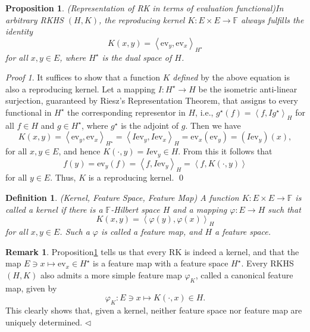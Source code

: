 \documentclass[a4paper,12pt]{article}
\newtheorem{prp}[thm]{Proposition}
\newtheorem{dfn}[thm]{Definition}
\theoremstyle{remark}
\newtheorem*{prf}{Proof}
\theoremstyle{definition}
\newtheorem{rem}[thm]{Remark}
\theoremstyle{definition}
\theoremstyle{definition}
\newcommand{\ip}[2]{\left<#1, #2 \right>}
\newcommand{\ev}[1]{\mathrm{ev}_{#1}}
\newcommand{\adj}[1]{#1^{\star}}
\newcommand{\fin}{\hfill \( \triangleleft \) }
\begin{document}
\begin{prp} (Representation of RK in terms of evaluation functional)\label{Representation of RK in terms of ev}
	In arbitrary RKHS \( (H,K) \), the reproducing kernel \( K:E \times E \to \mathbb{F} \) always fulfills the identity
	\begin{equation*}
		K(x,y) = \ip{\ev{y}}{\ev{x}}_{\adj{H}}
	\end{equation*}
	for all \( x,y \in E \), where \( \adj{H} \) is the dual space of \( H \).
\end{prp}
\begin{prf}
	It suffices to show that a function \( K \) \textit{defined} by the above equation is also a reproducing kernel.
	Let a mapping \( I:\adj{H}\to H \) be the isometric anti-linear surjection,  guaranteed by Riesz's Representation Theorem, that assigns to every functional in \( \adj{H} \) the corresponding representor in \( H \), i.e., \( \adj{g}(f)=\ip{f}{I \adj{g}}_H \) for all \( f \in H \) and \( g \in \adj{H} \), where \( \adj{g} \) is the adjoint of \( g \). Then we have
	\begin{equation*}
		K(x,y) = \ip{\ev{y}}{\ev{x}}_{\adj{H}}
		= \ip{I \ev{y}}{I \ev{x}}_H
		= \ev{x} \left( \ev{y} \right) = \left( I \ev{y} \right)(x),
	\end{equation*}
	for all \( x,y \in E \), and hence \( K(\cdot ,y) = I \ev{y} \in H \). From this it follows that
	\begin{equation*}
		f(y) = \ev{y}(f) = \ip{f}{I \ev{y}}_H = \ip{f}{K(\cdot ,y)}
	\end{equation*}
	for all \( y \in E \). Thus, \( K \) is a reproducing kernel.
	\qed\end{prf}

\begin{dfn} (Kernel, Feature Space, Feature Map)
	A function \( K:E \times E \to \mathbb{F} \) is called a kernel if there is a \( \mathbb{F}\)-Hilbert space \( H \) and a mapping \( \varphi:E \to H \) such that
	\begin{equation*}
		K(x,y) = \ip{\varphi(y)}{\varphi(x)}_H
	\end{equation*}
	for all \( x,y \in E \).
	Such a \( \varphi \) is called a feature map, and \( H \) a feature space.
\end{dfn}
\begin{rem}
	Proposition\ref{Representation of RK in terms of ev} tells us that every RK is indeed a kernel, and that the map \( E \ni x \mapsto \ev{x} \in \adj{H} \) is a feature map with a feature space \( \adj{H} \).
	Every RKHS \( (H,K) \) also admits a more simple feature map \( \varphi_K \), called a canonical feature map, given by
	\begin{equation*}
		\varphi_K:E \ni x \mapsto K(\cdot ,x) \in H.
	\end{equation*}
	This clearly shows that, given a kernel, neither feature space nor feature map are uniquely determined.
	\fin\end{rem}
\end{document}
